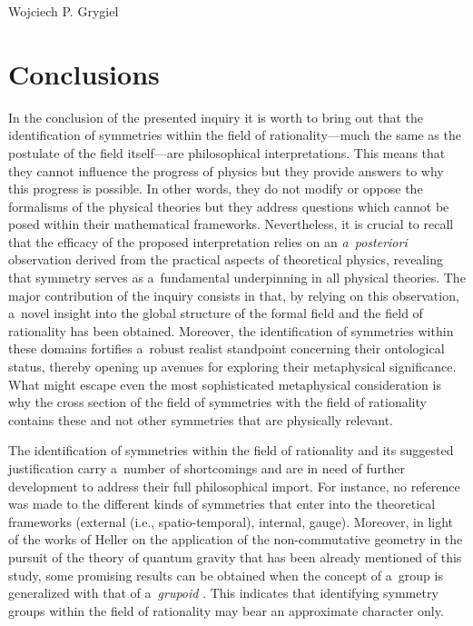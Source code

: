 \begin{artengenv}{Wojciech P. Grygiel}
\section*{Conclusions}

In the conclusion of the presented inquiry it is worth to bring out that the identification of symmetries within the field of rationality---much the same as the postulate of the field itself---are philosophical interpretations. This means that they cannot influence the progress of physics but they provide answers to why this progress is possible. In other words, they do not modify or oppose the formalisms of the physical theories but they address questions which cannot be posed within their mathematical frameworks. Nevertheless, it is crucial to recall that the efficacy of the proposed interpretation relies on an \textit{a~posteriori} observation derived from the practical aspects of theoretical physics, revealing that symmetry serves as a~fundamental underpinning in all physical theories. The major contribution of the inquiry consists in that, by relying on this observation, a~novel insight into the global structure of the formal field and the field of rationality has been obtained. Moreover, the identification of symmetries within these domains fortifies a~robust realist standpoint concerning their ontological status, thereby opening up avenues for exploring their metaphysical significance. What might escape even the most sophisticated metaphysical consideration is why the cross section of the field of symmetries with the field of rationality contains these and not other symmetries that are physically relevant.



The identification of symmetries within the field of rationality and its suggested justification carry a~number of shortcomings and are in need of further development to address their full philosophical import. For instance, no reference was made to the different kinds of symmetries that enter into the theoretical frameworks (external (i.e., spatio-temporal), internal, gauge). Moreover, in light of the works of Heller on the application of the non-commutative geometry in the pursuit of the theory of quantum gravity that has been already mentioned of this study, some promising results can be obtained when the concept of a~group is generalized with that of a~\textit{grupoid} 
\parencite[e.g.,][]{heller_evolution_2006}. %
 This indicates that identifying symmetry groups within the field of rationality may bear an approximate character only.




\end{artengenv}
